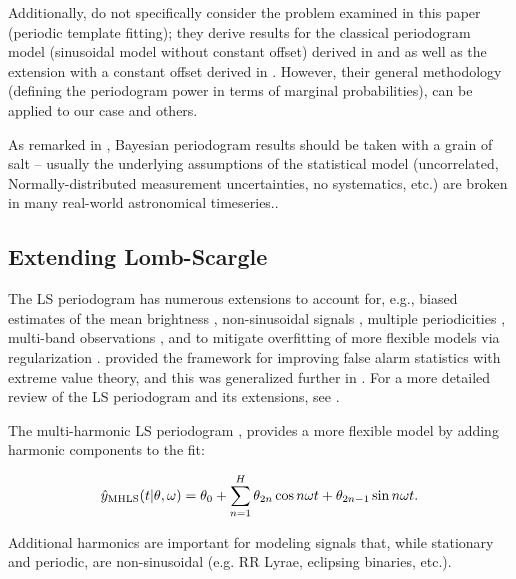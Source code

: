 \documentclass[apj]{emulateapj}
\begin{document}
Additionally, \cite{Mortier_et_al_2015} do not specifically consider the problem examined in this paper (periodic template fitting); they derive results for the classical periodogram model (sinusoidal model without constant offset) derived in
\cite{Lomb_1976} and \cite{Scargle_1982} as well as the extension with a constant offset derived in \cite{Zechmeister+Kurster_2009}. However, their general methodology (defining the periodogram power in terms of marginal probabilities), can be applied to our case and others.

As remarked in \citep{Vanderplas_2018}, Bayesian periodogram results should be taken with a grain of salt -- usually the underlying assumptions of the statistical model (uncorrelated, Normally-distributed measurement uncertainties, no systematics, etc.) are broken in many real-world astronomical timeseries..



\subsection{Extending Lomb-Scargle}

The LS periodogram has numerous extensions to account for, e.g., biased estimates of the mean brightness
\citep{Zechmeister+Kurster_2009}, non-sinusoidal signals \citep{Schwarzenberg-Czerny_1996,Bretthorst_2003,Palmer_2009,Baluev_2009,Baluev_2013a}, multiple periodicities \citep{Baluev_2013b,Baluev_2013c},
multi-band observations \citep{Vanderplas+Ivezic_2015}, and to mitigate overfitting of more
flexible models via regularization \citep{Vanderplas+Ivezic_2015}. \cite{Baluev_2008} provided the framework for improving false alarm statistics with extreme value theory, and this was generalized further in \cite{Baluev_2013}. For a more detailed review
of the LS periodogram and its extensions, see \cite{Vanderplas_2018}.

The multi-harmonic LS periodogram \citep[][MHGLS]{Bretthorst+Chi-Cheng_1988,Schwarzenberg-Czerny_1996,Palmer_2009}, provides a more
flexible model by adding harmonic components to the fit:

\begin{equation}
    \hat{y}_{\rm MHLS}(t|\theta, \omega) = \theta_0 + \sum_{n=1}^H \theta_{2n}\cos{n\omega t} + \theta_{2n-1}\sin{n\omega t}.
\end{equation}

Additional harmonics are important for modeling signals that, while stationary and periodic,
are non-sinusoidal (e.g. RR Lyrae, eclipsing binaries, etc.).
\end{document}
